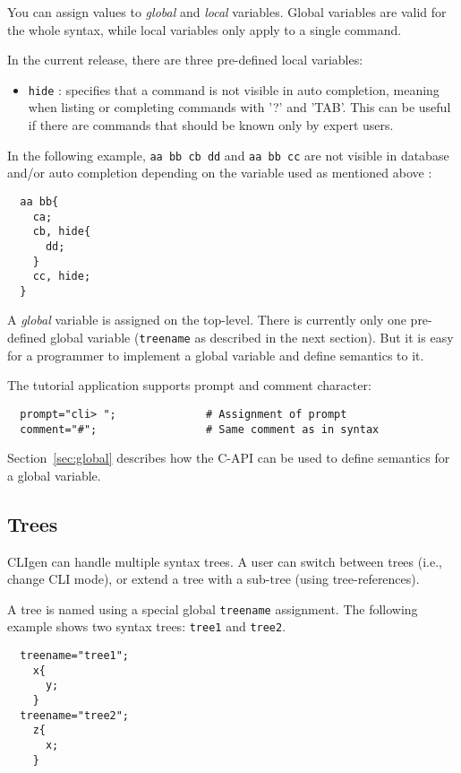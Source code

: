 \documentclass[a4paper, 10pt] {article}
\begin{document}
You can assign values to \emph{global} and \emph{local}
variables. Global variables are valid for the whole syntax, while
local variables only apply to a single command.

In the current release, there are three pre-defined local variables:
\begin{itemize}
\item
{\tt hide} : specifies that a command is not visible in auto completion, meaning when listing or completing commands with '?' and 'TAB'. This can be useful if there are commands that should be known only by expert users.
\end{itemize}

In the following example, {\tt aa bb cb dd} and {\tt aa bb cc} are not visible in database and/or auto completion
depending on the variable used as mentioned above :
\begin{verbatim}
  aa bb{
    ca;
    cb, hide{
      dd;
    }
    cc, hide;
  }
\end{verbatim}

A {\em global} variable is assigned on the top-level.  There is
currently only one pre-defined global variable ({\tt treename} as
described in the next section).  But it is easy for a programmer to
implement a global variable and define semantics to it. 

The tutorial application supports prompt and comment character:
\begin{verbatim}
  prompt="cli> ";              # Assignment of prompt
  comment="#";                 # Same comment as in syntax
\end{verbatim}
Section~\ref{sec:global} describes how the C-API can be used to define
semantics for a global variable.

\subsection{Trees}

CLIgen can handle multiple syntax trees. A user can switch between
trees (i.e., change CLI mode), or extend a tree with a sub-tree (using
tree-references). 

A tree is named using a special global {\tt treename} assignment. The
following example shows two syntax trees: {\tt tree1} and {\tt tree2}.
\begin{verbatim}
  treename="tree1";
    x{
      y;
    }
  treename="tree2";
    z{
      x;
    }
\end{verbatim}
\end{document}
